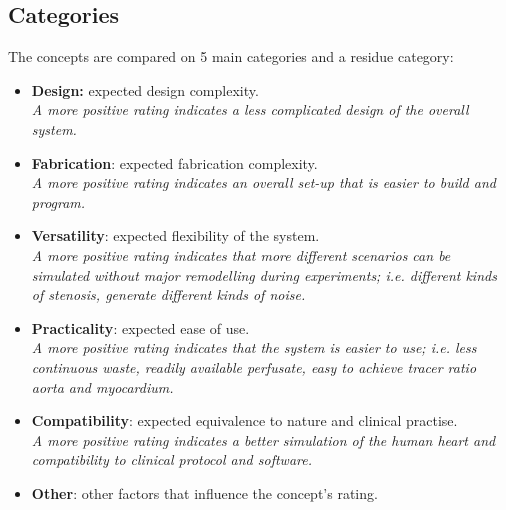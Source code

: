 \subsection{Categories}
The concepts are compared on 5 main categories and a residue category: 
\begin{itemize}
	\item \textbf{Design:} expected design complexity. \\ \textit{A more positive rating indicates a less complicated design of the overall system.}
	\item \textbf{Fabrication}: expected fabrication complexity. \\ \textit{A more positive rating indicates an overall set-up that is easier to build and program.}
	\item \textbf{Versatility}: expected flexibility of the system.  \\ \textit{A more positive rating indicates that more different scenarios can be simulated without major remodelling during experiments; i.e. different kinds of stenosis, generate different kinds of noise.}
	\item \textbf{Practicality}: expected ease of use. \\ \textit{A more positive rating indicates that the system is easier to use; i.e. less continuous waste, readily available perfusate, easy to achieve tracer ratio aorta and myocardium.}
	\item \textbf{Compatibility}: expected equivalence to nature and clinical practise.  \\ \textit{A more positive rating indicates a better simulation of the human heart and compatibility to clinical protocol and software.}
	\item \textbf{Other}: other factors that influence the concept's rating.
\end{itemize}

